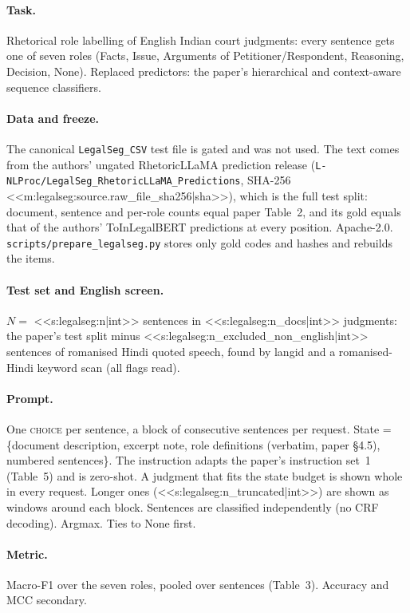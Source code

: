 \paragraph{Task.} Rhetorical role labelling of English Indian court judgments: every sentence gets one of seven roles
(Facts, Issue, Arguments of Petitioner/Respondent, Reasoning, Decision, None). Replaced predictors: the paper's
hierarchical and context-aware sequence classifiers.

\paragraph{Data and freeze.} The canonical \texttt{LegalSeg\_CSV} test file is gated and was not used. The text comes
from the authors' ungated RhetoricLLaMA prediction release (\texttt{L-NLProc/}\allowbreak\texttt{LegalSeg\_RhetoricLLaMA\_}\allowbreak\texttt{Predictions},
SHA-256 <<m:legalseg:source.raw_file_sha256|sha>>), which is the full test split: document, sentence and per-role
counts equal paper Table~2, and its gold equals that of the authors' ToInLegalBERT predictions at every position.
Apache-2.0. \texttt{scripts/prepare\_legalseg.py} stores only gold codes and hashes and rebuilds the items.

\paragraph{Test set and English screen.} $N=$ <<s:legalseg:n|int>> sentences in <<s:legalseg:n_docs|int>> judgments:
the paper's test split minus <<s:legalseg:n_excluded_non_english|int>> sentences of romanised Hindi quoted speech,
found by langid and a romanised-Hindi keyword scan (all flags read).

\paragraph{Prompt.} One \textsc{choice} per sentence, a block of consecutive sentences per request. State =
\{document description, excerpt note, role definitions (verbatim, paper \S4.5), numbered sentences\}. The instruction
adapts the paper's instruction set~1 (Table~5) and is zero-shot. A judgment that fits the state budget is shown whole in
every request. Longer ones (<<s:legalseg:n_truncated|int>>) are shown as windows around each block. Sentences are
classified independently (no CRF decoding). Argmax. Ties to None first.

\paragraph{Metric.} Macro-F1 over the seven roles, pooled over sentences (Table~3). Accuracy and MCC secondary.

